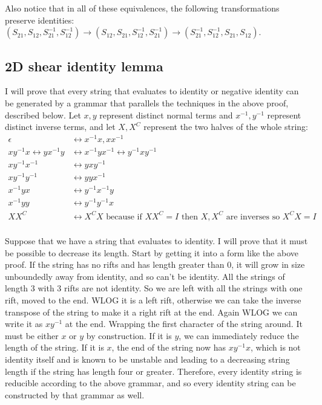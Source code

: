 \documentclass{article}
\begin{document}
Also notice that in all of these equivalences, the following transformations preserve identities: $(S_{21}, S_{12}, S_{21}^{-1}, S_{12}^{-1}) \to (S_{12}, S_{21}, S_{12}^{-1}, S_{21}^{-1}) \to (S_{21}^{-1}, S_{12}^{-1}, S_{21}, S_{12})$.

\subsection{2D shear identity lemma}
I will prove that every string that evaluates to identity or negative identity can be generated by a grammar that parallels the techniques in the above proof, described below. Let $x, y$ represent distinct normal terms and $x^{-1}, y^{-1}$ represent distinct inverse terms, and let $X, X^C$ represent the two halves of the whole string:
\begin{align*}
    \epsilon &\leftrightarrow x^{-1}x, xx^{-1}\\
    xy^{-1}x \leftrightarrow yx^{-1}y &\leftrightarrow x^{-1}yx^{-1} \leftrightarrow  y^{-1}xy^{-1}\\
    xy^{-1}x^{-1} &\leftrightarrow yxy^{-1}\\
    xy^{-1}y^{-1} &\leftrightarrow yyx^{-1}\\
    x^{-1}yx &\leftrightarrow y^{-1}x^{-1}y\\
    x^{-1}yy &\leftrightarrow y^{-1}y^{-1}x\\
    XX^C &\leftrightarrow X^CX \text{ because if $XX^C=I$ then $X,X^C$ are inverses so $X^CX=I$}\\
\end{align*}

Suppose that we have a string that evaluates to identity. I will prove that it must be possible to decrease its length. Start by getting it into a form like the above proof. If the string has no rifts and has length greater than 0, it will grow in size unboundedly away from identity, and so can't be identity. All the strings of length 3 with 3 rifts are not identity. So we are left with all the strings with one rift, moved to the end. WLOG it is a left rift, otherwise we can take the inverse transpose of the string to make it a right rift at the end.
Again WLOG we can write it as $xy^{-1}$ at the end. Wrapping the first character of the string around. It must be either $x$ or $y$ by construction. If it is $y$, we can immediately reduce the length of the string. If it is $x$, the end of the string now has $xy^{-1}x$, which is not identity itself and is known to be unstable and leading to a decreasing string length if the string has length four or greater. Therefore, every identity string is reducible according to the above grammar, and so every identity string can be constructed by that grammar as well.
\end{document}
